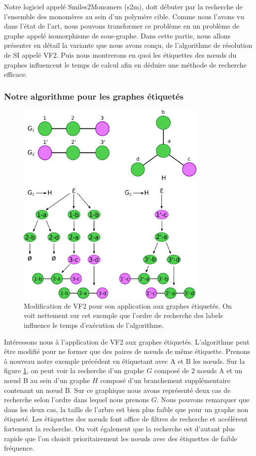 \label{isomorphisme_p}

Notre logiciel appelé Smiles2Monomers (s2m), doit débuter par la recherche de l'ensemble des monomères au sein d'un polymère cible.
Comme nous l'avons vu dans l'état de l'art, nous pouvons transformer ce problème en un problème de graphe appelé isomorphisme de sous-graphe.
Dans cette partie, nous allons présenter en détail la variante que nous avons conçu, de l'algorithme de résolution de SI appelé VF2.
Puis nous montrerons en quoi les étiquettes des n\oe{}uds du graphes influencent le temps de calcul afin en déduire une méthode de recherche efficace.

\subsubsection{Notre algorithme pour les graphes étiquetés}


\begin{figure}[!ht]
  \begin{center}
    \includegraphics[width=350px]{Figures/s2m/recherche/VF2_labels.png}
    \caption{\label{vf2_labels}Modification de VF2 pour son application aux graphes étiquetés.
    On voit nettement sur cet exemple que l'ordre de recherche des labels influence le temps d'exécution de l'algorithme.}
  \end{center}
\end{figure}

Intéressons nous à l'application de VF2 aux graphes étiquetés.
L'algorithme peut être modifié pour ne former que des paires de n\oe{}uds de même étiquette.
Prenons à nouveau notre exemple précédent en étiquetant avec A et B les n\oe{}uds.
Sur la figure \ref{vf2_labels}, on peut voir la recherche d'un graphe $G$ composé de 2 n\oe{}uds A et un n\oe{}ud B au sein d'un graphe $H$
composé d'un branchement supplémentaire contenant un n\oe{}ud B.
Sur ce graphique nous avons représenté deux cas de recherche selon l'ordre dans lequel nous prenons $G$.
Nous pouvons remarquer que dans les deux cas, la taille de l'arbre est bien plus faible que pour un graphe non étiqueté.
Les étiquettes des n\oe{}uds font office de filtres de recherche et accélèrent fortement la recherche.
On voit également que la recherche est d'autant plus rapide que l'on choisit prioritairement les n\oe{}uds avec des étiquettes de faible fréquence.

